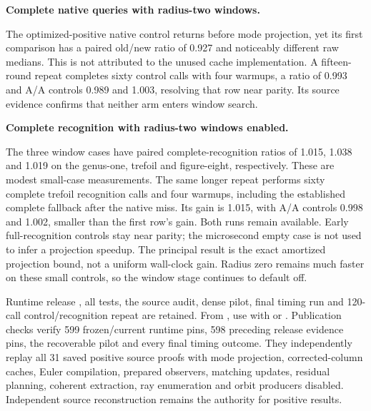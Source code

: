 \begin{samepage}
\noindent\textbf{Complete native queries with radius-two windows.}

\end{samepage}

The optimized-positive native control returns before mode projection, yet its
first comparison has a paired old/new ratio of 0.927 and noticeably different
raw medians. This is not attributed to the unused cache implementation.
A fifteen-round repeat completes sixty control calls with four warmups,
a ratio of 0.993 and A/A controls 0.989 and 1.003, resolving that row near
parity. Its source evidence confirms that neither arm enters window search.

\begin{samepage}
\noindent\textbf{Complete recognition with radius-two windows enabled.}

\end{samepage}

The three window cases have paired complete-recognition ratios of 1.015,
1.038 and 1.019 on the genus-one, trefoil and figure-eight, respectively.
These are modest small-case measurements. The same longer repeat performs
sixty complete trefoil recognition calls and four warmups, including the
established complete fallback after the native miss. Its gain is 1.015,
with A/A controls 0.998 and 1.002, smaller than the first row's gain.
Both runs remain available. Early full-recognition controls stay near parity;
the microsecond empty case is not used to infer a projection speedup.
The principal result is the exact amortized projection bound, not a uniform
wall-clock gain. Radius zero remains much faster on these small controls,
so the window stage continues to default off.

\begin{sloppypar}
Runtime release , all tests, the source audit, dense pilot,
final timing run and 120-call control/recognition repeat are retained.
From , use  with
 or .
Publication checks verify 599 frozen/current runtime pins, 598 preceding
release evidence pins, the recoverable pilot and every final timing outcome.
They independently replay all 31 saved positive source proofs with mode
projection, corrected-column caches, Euler compilation, prepared observers,
matching updates, residual planning, coherent extraction, ray enumeration
and orbit producers disabled. Independent source reconstruction remains
the authority for positive results.
\end{sloppypar}
